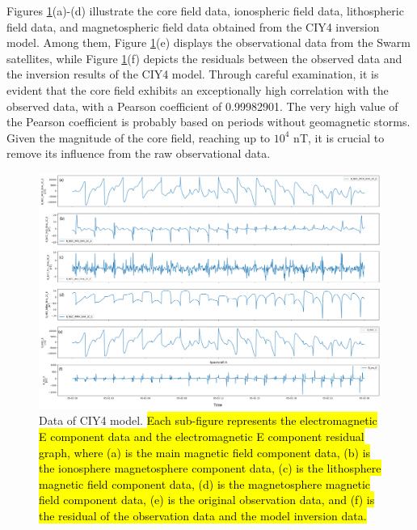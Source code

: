 \documentclass[3p,authoryear,preprint,12pt]{elsarticle}
\begin{document}
Figures \ref{fig:cyi4}(a)-(d) illustrate the core field data, ionospheric field data, lithospheric field data, and magnetospheric field data obtained from the CIY4 inversion model. Among them, Figure \ref{fig:cyi4}(e) displays the observational data from the Swarm satellites, while Figure \ref{fig:cyi4}(f) depicts the residuals between the observed data and the inversion results of the CIY4 model. Through careful examination, it is evident that the core field exhibits an exceptionally high correlation with the observed data, with a Pearson coefficient of 0.99982901. {The very high value of the Pearson coefficient is probably based on periods without geomagnetic storms.} Given the magnitude of the core field, reaching up to $10^4$ nT, it is crucial to remove its influence from the raw observational data.
\begin{figure}[htbp]
	\centering
	\includegraphics[width=1\linewidth]{CYI4Eng.png}
	\caption{Data of CIY4 model. \hl{Each sub-figure represents the electromagnetic E component data and the electromagnetic E component residual graph, where (a) is the main magnetic field component data, (b) is the ionosphere magnetosphere component data, (c) is the lithosphere magnetic field component data, (d) is the magnetosphere magnetic field component data, (e) is the original observation data, and (f) is the residual of the observation data and the model inversion data.}}
	\label{fig:cyi4}
\end{figure}
%
\end{document}

